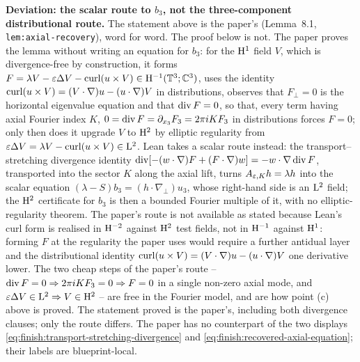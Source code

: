 \textbf{Deviation: the scalar route to $b_3$, not the three-component distributional
route.}  The statement above is the paper's (Lemma~8.1, \texttt{lem:axial-recovery}), word for
word.  The proof below is not.  The paper proves the lemma without writing an equation for
$b_3$: for the $\mathrm{H}^1$ field $V$, which is divergence-free by construction, it forms
$F=\lambda V-\varepsilon\Delta V-\operatorname{curl}(u\times V)\in\mathrm{H}^{-1}(\mathbb{T}^3;\mathbb{C}^3)$, uses the identity
$\operatorname{curl}(u\times V)=(V\cdot\nabla)u-(u\cdot\nabla)V$ in distributions, observes that $F_\perp=0$ is
the horizontal eigenvalue equation and that $\operatorname{div} F=0$, so that, every term having axial
Fourier index $K$, $0=\operatorname{div} F=\partial_{x_3}F_3=2\pi iKF_3$ in distributions forces $F=0$; only
then does it upgrade $V$ to $\mathrm{H}^2$ by elliptic regularity from
$\varepsilon\Delta V=\lambda V-\operatorname{curl}(u\times V)\in\mathrm{L}^2$.  Lean takes a scalar route instead: the
transport--stretching divergence identity
$\operatorname{div}[-(w\cdot\nabla)F+(F\cdot\nabla)w]=-w\cdot\nabla\operatorname{div} F$, transported into the sector
$K$ along the axial lift, turns $A_{\varepsilon,K}h=\lambda h$ into the scalar equation
$(\lambda-S)b_3=(h\cdot\nabla_\perp)u_3$, whose right-hand side is an $\mathrm{L}^2$ field;
the $\mathrm{H}^2$ certificate for $b_3$ is then a bounded Fourier multiple of it, with no
elliptic-regularity theorem.  The paper's route is not available as stated because Lean's
curl form is realised in $\mathrm{H}^{-2}$ against $\mathrm{H}^2$ test fields, not in $\mathrm{H}^{-1}$ against
$\mathrm{H}^1$: forming $F$ at the regularity the paper uses would require a further antidual layer
and the distributional identity $\operatorname{curl}(u\times V)=(V\cdot\nabla)u-(u\cdot\nabla)V$ one
derivative lower.  The two cheap steps of the paper's route -- $\operatorname{div} F=0\Rightarrow
2\pi iKF_3=0\Rightarrow F=0$ in a single non-zero axial mode, and $\varepsilon\Delta V\in\mathrm{L}^2
\Rightarrow V\in\mathrm{H}^2$ -- are free in the Fourier model, and are how point (c) above is
proved.  The statement proved is the paper's, including both divergence clauses; only the
route differs.  The paper has no counterpart of the two displays
\eqref{eq:finish:transport-stretching-divergence} and
\eqref{eq:finish:recovered-axial-equation}; their labels are blueprint-local.

